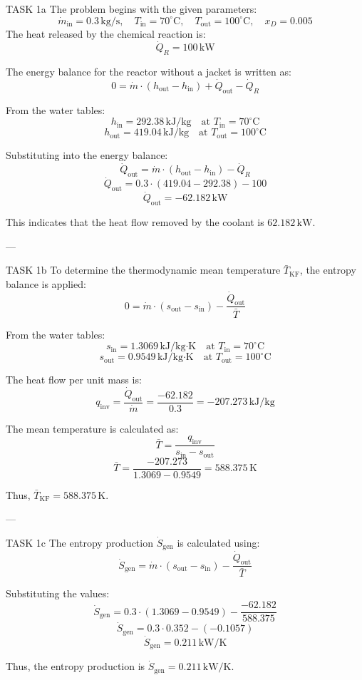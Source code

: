 TASK 1a  
The problem begins with the given parameters:  
\[
\dot{m}_{\text{in}} = 0.3 \, \text{kg/s}, \quad T_{\text{in}} = 70^\circ\text{C}, \quad T_{\text{out}} = 100^\circ\text{C}, \quad x_D = 0.005
\]  
The heat released by the chemical reaction is:  
\[
\dot{Q}_R = 100 \, \text{kW}
\]  

The energy balance for the reactor without a jacket is written as:  
\[
0 = \dot{m} \cdot (h_{\text{out}} - h_{\text{in}}) + \dot{Q}_{\text{out}} - \dot{Q}_R
\]  

From the water tables:  
\[
h_{\text{in}} = 292.38 \, \text{kJ/kg} \quad \text{at } T_{\text{in}} = 70^\circ\text{C}
\]  
\[
h_{\text{out}} = 419.04 \, \text{kJ/kg} \quad \text{at } T_{\text{out}} = 100^\circ\text{C}
\]  

Substituting into the energy balance:  
\[
\dot{Q}_{\text{out}} = \dot{m} \cdot (h_{\text{out}} - h_{\text{in}}) - \dot{Q}_R
\]  
\[
\dot{Q}_{\text{out}} = 0.3 \cdot (419.04 - 292.38) - 100
\]  
\[
\dot{Q}_{\text{out}} = -62.182 \, \text{kW}
\]  

This indicates that the heat flow removed by the coolant is \( 62.182 \, \text{kW} \).  

---

TASK 1b  
To determine the thermodynamic mean temperature \( \bar{T}_{\text{KF}} \), the entropy balance is applied:  
\[
0 = \dot{m} \cdot (s_{\text{out}} - s_{\text{in}}) - \frac{\dot{Q}_{\text{out}}}{\bar{T}}
\]  

From the water tables:  
\[
s_{\text{in}} = 1.3069 \, \text{kJ/kg·K} \quad \text{at } T_{\text{in}} = 70^\circ\text{C}
\]  
\[
s_{\text{out}} = 0.9549 \, \text{kJ/kg·K} \quad \text{at } T_{\text{out}} = 100^\circ\text{C}
\]  

The heat flow per unit mass is:  
\[
q_{\text{inv}} = \frac{\dot{Q}_{\text{out}}}{\dot{m}} = \frac{-62.182}{0.3} = -207.273 \, \text{kJ/kg}
\]  

The mean temperature is calculated as:  
\[
\bar{T} = \frac{q_{\text{inv}}}{s_{\text{in}} - s_{\text{out}}}
\]  
\[
\bar{T} = \frac{-207.273}{1.3069 - 0.9549} = 588.375 \, \text{K}
\]  

Thus, \( \bar{T}_{\text{KF}} = 588.375 \, \text{K} \).  

---

TASK 1c  
The entropy production \( \dot{S}_{\text{gen}} \) is calculated using:  
\[
\dot{S}_{\text{gen}} = \dot{m} \cdot (s_{\text{out}} - s_{\text{in}}) - \frac{\dot{Q}_{\text{out}}}{\bar{T}}
\]  

Substituting the values:  
\[
\dot{S}_{\text{gen}} = 0.3 \cdot (1.3069 - 0.9549) - \frac{-62.182}{588.375}
\]  
\[
\dot{S}_{\text{gen}} = 0.3 \cdot 0.352 - (-0.1057)
\]  
\[
\dot{S}_{\text{gen}} = 0.211 \, \text{kW/K}
\]  

Thus, the entropy production is \( \dot{S}_{\text{gen}} = 0.211 \, \text{kW/K} \).  